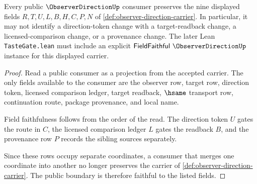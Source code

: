 \begin{theorem}
\label{thm:observer-direction-field-faithful-boundary}
Every public $\ObserverDirectionUp$ consumer preserves the nine displayed fields $R,T,U,L,B,H,C,P,N$ of \autoref{def:observer-direction-carrier}. In particular, it may not identify a direction-token change with a target-readback change, a licensed-comparison change, or a provenance change. The later Lean \texttt{TasteGate.lean} must include an explicit $\mathsf{FieldFaithful}\ \ObserverDirectionUp$ instance for this displayed carrier.
\end{theorem}
\begin{proof}
Read a public consumer as a projection from the accepted carrier. The only fields available to the consumer are the observer row, target row, direction token, licensed comparison ledger, target readback, $\hsame$ transport row, continuation route, package provenance, and local name.

Field faithfulness follows from the order of the read. The direction token $U$ gates the route in $C$, the licensed comparison ledger $L$ gates the readback $B$, and the provenance row $P$ records the sibling sources separately.

Since these rows occupy separate coordinates, a consumer that merges one coordinate into another no longer preserves the carrier of \autoref{def:observer-direction-carrier}. The public boundary is therefore faithful to the listed fields.
\end{proof}


\begin{closurestatus}{\ObserverDirectionUp}
  \theoryclosure{\seedClosure}
  \formalstatus{\unformalizedV}
\end{closurestatus}
